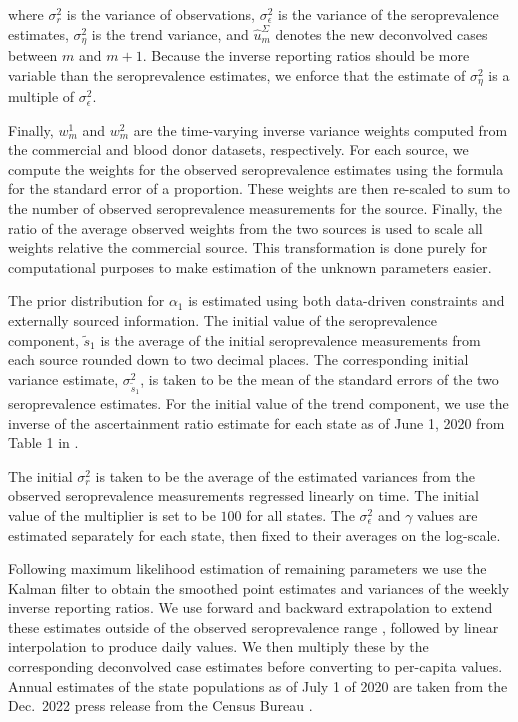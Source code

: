 where $\sigma^2_r$ is the variance of observations, $\sigma^2_\epsilon$ is the
variance of the seroprevalence estimates, $\sigma^2_\eta$ is the trend variance,
and $\widehat{u}^\Sigma_{m}$ denotes the new deconvolved cases between $m$ and
$m+1$. Because the inverse reporting ratios should be more variable than the
seroprevalence estimates, we enforce that the estimate of $\sigma^2_\eta$ is a
multiple of $\sigma^2_\epsilon$. 

Finally, $w^1_{m}$ and $w^2_{m}$ are the time-varying inverse variance weights
computed from the commercial and blood donor datasets, respectively. For each
source, we compute the weights for the observed seroprevalence estimates using
the formula for the standard error of a proportion. These weights are then
re-scaled to sum to the number of observed seroprevalence measurements for the
source. Finally, the ratio of the average observed weights from the two sources
is used to scale all weights relative the commercial source. This transformation
is done purely for computational purposes to make estimation of the unknown
parameters easier.

The prior distribution for $\alpha_1$ is estimated using both data-driven
constraints and externally sourced information. The initial value of the
seroprevalence component, $\tilde{s}_{1}$ is the average of the initial
seroprevalence measurements from each source rounded down to two decimal places.
The corresponding initial variance estimate, $\sigma^2_{\tilde{s}_{1}}$, is
taken to be the mean of the standard errors of the two seroprevalence estimates.
For the initial value of the trend component, we use the inverse of the
ascertainment ratio estimate for each state as of June 1, 2020 from Table 1 in  
\citep{unwin2020state}.

The initial $\sigma^2_r$ is taken to be the average of the estimated variances
from the observed seroprevalence measurements regressed linearly on time.
The initial value of the multiplier is set to be $100$ for all states. The
$\sigma^2_\epsilon$ and $\gamma$ values are estimated separately for each state,
then fixed to their averages on the log-scale.

Following maximum likelihood estimation of remaining parameters we use the
Kalman filter to obtain the smoothed point estimates and variances of the weekly
inverse reporting ratios. We use forward and backward extrapolation to extend
these estimates outside of the observed seroprevalence range
\citep{durbin2012time}, followed by linear interpolation to produce daily
values. We then multiply these by the
corresponding deconvolved case estimates before converting to per-capita values.
Annual estimates of the state
populations as of July 1 of 2020 are taken from the Dec.\
2022 press release from the \US Census Bureau \citep{uscensus2022annual}.


